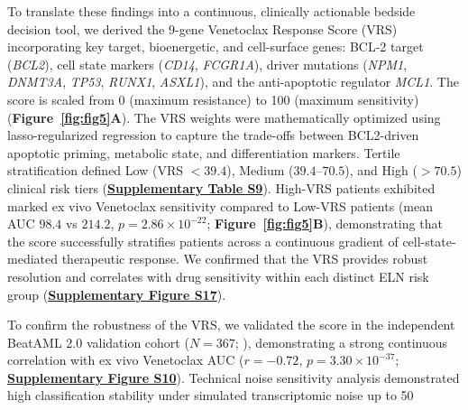 \documentclass[11pt,a4paper]{article}
\begin{document}
To translate these findings into a continuous, clinically actionable bedside decision tool, we derived the 9-gene Venetoclax Response Score (VRS) incorporating key target, bioenergetic, and cell-surface genes: BCL-2 target (\textit{BCL2}), cell state markers (\textit{CD14}, \textit{FCGR1A}), driver mutations (\textit{NPM1}, \textit{DNMT3A}, \textit{TP53}, \textit{RUNX1}, \textit{ASXL1}), and the anti-apoptotic regulator \textit{MCL1}. The score is scaled from 0 (maximum resistance) to 100 (maximum sensitivity) (\textbf{Figure~\ref{fig:fig5}A}). The VRS weights were mathematically optimized using lasso-regularized regression to capture the trade-offs between BCL2-driven apoptotic priming, metabolic state, and differentiation markers. Tertile stratification defined Low (VRS $<39.4$), Medium ($39.4$--$70.5$), and High ($>70.5$) clinical risk tiers (\href{Supplementary_Methods.pdf}{\textbf{Supplementary Table S9}}). High-VRS patients exhibited marked ex vivo Venetoclax sensitivity compared to Low-VRS patients (mean AUC $98.4$ vs $214.2$, $p=2.86\times10^{-22}$; \textbf{Figure~\ref{fig:fig5}B}), demonstrating that the score successfully stratifies patients across a continuous gradient of cell-state-mediated therapeutic response. We confirmed that the VRS provides robust resolution and correlates with drug sensitivity within each distinct ELN risk group (\textbf{\href{Supplementary_Methods.pdf}{\textbf{Supplementary Figure S17}}}).

To confirm the robustness of the VRS, we validated the score in the independent BeatAML 2.0 validation cohort ($N=367$; \cite{bottomly2022,bottomly2022beataml}), demonstrating a strong continuous correlation with ex vivo Venetoclax AUC ($r=-0.72$, $p=3.30\times10^{-37}$; \textbf{\href{Supplementary_Methods.pdf}{\textbf{Supplementary Figure S10}}}). Technical noise sensitivity analysis demonstrated high classification stability under simulated transcriptomic noise up to 50%
\end{document}
